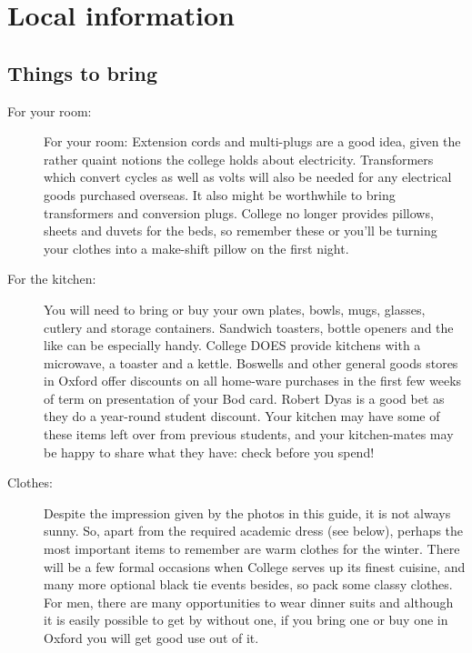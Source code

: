 
\chapter{Local information}

\section{Things to bring}

\begin{description}
  \item[For your room:] For your room: Extension cords and multi-plugs are a good idea, given the rather quaint notions the college holds about electricity. Transformers which convert cycles as well as volts will also be needed for any electrical goods purchased overseas. It also might be worthwhile to bring transformers and conversion plugs. College no longer provides pillows, sheets and duvets for the beds, so remember these or you'll be turning your clothes into a make-shift pillow on the first night.
  
  \item[For the kitchen:] You will need to bring or buy your own plates, bowls, mugs, glasses, cutlery and storage containers. Sandwich toasters, bottle openers and the like can be especially handy. College DOES provide kitchens with a microwave, a toaster and a kettle. Boswells and other general goods stores in Oxford offer discounts on all home-ware purchases in the first few weeks of term on presentation of your Bod card. Robert Dyas is a good bet as they do a year-round student discount. Your kitchen may have some of these items left over from previous students, and your kitchen-mates may be happy to share what they have: check before you spend!
  
  \item[Clothes:] Despite the impression given by the photos in this guide, it is not always sunny. So, apart from the required academic dress (see below), perhaps the most important items to remember are warm clothes for the winter. There will be a few formal occasions when College serves up its finest cuisine, and many more optional black tie events besides, so pack some classy clothes. For
men, there are many opportunities to wear dinner suits and although it is easily possible to get by without one, if you bring one or buy one in Oxford you will get good use out of it.

  \end{description}
